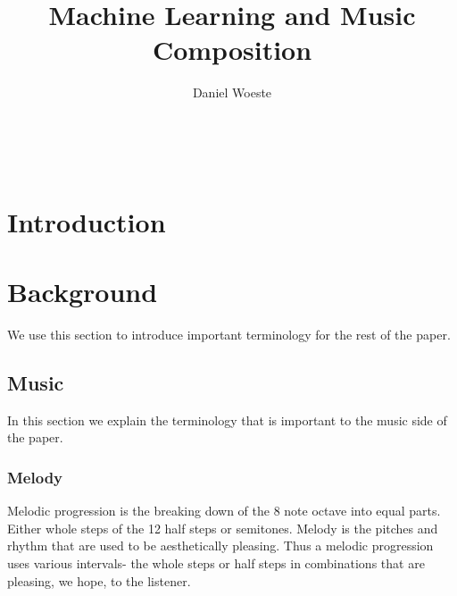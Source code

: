 \documentclass{sig-alternate}
\begin{document}

\title{Machine Learning and Music Composition}
\author{
\alignauthor
Daniel Woeste\\
	\\
	\\
	\\
}



\maketitle
\begin{abstract}

\end{abstract}

\section{Introduction}
\label{sec:introduction}

\section{Background}
\label{sec:background}
	We use this section to introduce important terminology for the rest of the paper. 

\subsection{Music}
\label{sec:music}
	In this section we explain the terminology that is important to the music side of the paper.
\subsubsection{Melody}
\label{sec:melody}
Melodic progression is the breaking down of the 8 note octave into equal parts.  Either whole steps of the 12 half steps or semitones.  
Melody is the pitches and rhythm that are used to be aesthetically pleasing.  
Thus a melodic progression uses various intervals- the whole steps or half steps in combinations that are pleasing, we hope, to the listener.  
\end{document}
